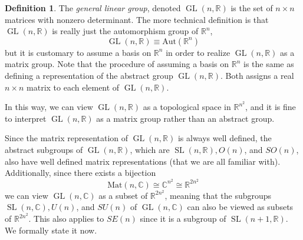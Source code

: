 \documentclass{article}
\DeclareMathOperator{\GL}{GL}
\DeclareMathOperator{\SL}{SL}
\theoremstyle{remark}
\theoremstyle{definition}
\newtheorem{definition}{Definition}[section]
\begin{document}
\begin{definition}
The \textit{general linear group}, denoted $\GL(n, \mathbb{R})$ is the set of $n \times n$ matrices with nonzero determinant. The more technical definition is that $\GL(n, \mathbb{R})$ is really just the automorphism group of $\mathbb{R}^n$, 
\[\GL(n, \mathbb{R}) \equiv \text{Aut}(\mathbb{R}^n)\]
but it is customary to assume a basis on $\mathbb{R}^n$ in order to realize $\GL(n, \mathbb{R})$ as a matrix group. Note that the procedure of assuming a basis on $\mathbb{R}^n$ is the same as defining a representation of the abstract group $\GL(n, \mathbb{R})$. Both assigns a real $n \times n$ matrix to each element of $\GL(n, \mathbb{R})$. 
\end{definition}

In this way, we can view $\GL(n, \mathbb{R})$ as a topological space in $\mathbb{R}^{n^2}$, and it is fine to interpret $\GL(n, \mathbb{R})$ as a matrix group rather than an abstract group. 

Since the matrix representation of $\GL(n, \mathbb{R})$ is always well defined, the abstract subgroups of $\GL(n, \mathbb{R})$, which are $\SL(n, \mathbb{R}), O(n)$, and $SO(n)$, also have well defined matrix representations (that we are all familiar with). Additionally, since there exists a bijection
\[\text{Mat}(n, \mathbb{C}) \cong \mathbb{C}^{n^2} \cong \mathbb{R}^{2 n^2}\]
we can view $\GL(n, \mathbb{C})$ as a subset of $\mathbb{R}^{2n^2}$, meaning that the subgroups $\SL(n, \mathbb{C}), U(n)$, and $SU(n)$ of $\GL(n, \mathbb{C})$ can also be viewed as subsets of $\mathbb{R}^{2n^2}$. This also applies to $SE(n)$ since it is a subgroup of $\SL(n+1, \mathbb{R})$. We formally state it now. 
\end{document}
